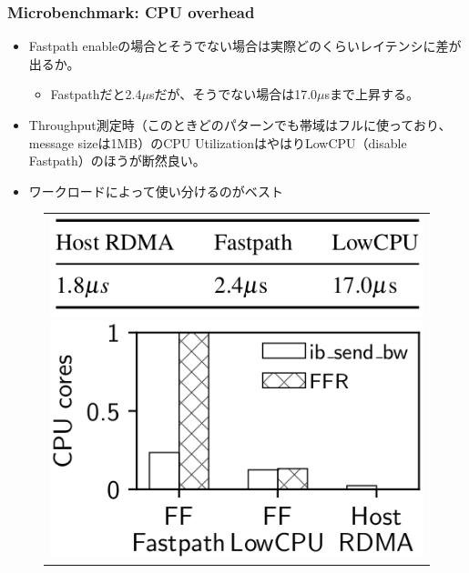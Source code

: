 \documentclass[dvipdfmx,9pt,notheorems]{beamer}
\theoremstyle{definition}
\begin{document}
\begin{frame}\frametitle{Microbenchmark: CPU overhead}
	\begin{itemize}
		\item Fastpath enableの場合とそうでない場合は実際どのくらいレイテンシに差が出るか。
		\begin{itemize}
			\item Fastpathだと2.4$\mu$sだが、そうでない場合は17.0$\mu$sまで上昇する。
		\end{itemize}
	\item Throughput測定時（このときどのパターンでも帯域はフルに使っており、message sizeは1MB）のCPU UtilizationはやはりLowCPU（disable Fastpath）のほうが断然良い。
	\item {\color{orange}ワークロードによって使い分けるのがベスト}
  \end{itemize}
  \begin{figure}[htb]
  	\centering
		\begin{tabular}{c}
			\begin{minipage}{0.4\hsize}
  			\includegraphics[scale=1]{fig/table3.png}
  		\end{minipage}
			\begin{minipage}{0.4\hsize}
  			\centering
  			\includegraphics[scale=1]{fig/figure12.png}
  		\end{minipage}
		\end{tabular}
  \end{figure}
\end{frame}
\end{document}
